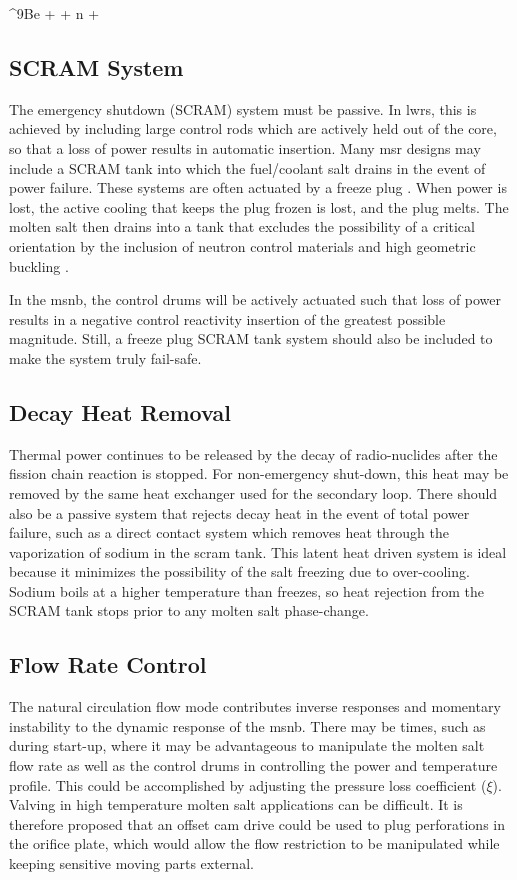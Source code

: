 \begin{reaction}\label{rxn:Be-n}
    ^{9}Be + \alpha {} + n + \gamma
\end{reaction}

\subsection{SCRAM System}
The emergency shutdown (\ie SCRAM) system must be passive. In \acsp{lwr}, this is achieved by including large control rods which are actively held out of the core, so that a loss of power results in automatic insertion. Many \acs{msr} designs may include a SCRAM tank into which the fuel/coolant salt drains in the event of power failure. These systems are often actuated by a freeze plug \cite{FreezePlug}. When power is lost, the active cooling that keeps the plug frozen is lost, and the plug melts. The molten salt then drains into a tank that excludes the possibility of a critical orientation by the inclusion of neutron control materials \cite[Ch. 1]{Charit} and high geometric buckling \cite[Ch. 6]{Lamarsh}.

In the \acs{msnb}, the control drums will be actively actuated such that loss of power results in a negative control reactivity insertion of the greatest possible magnitude. Still, a freeze plug SCRAM tank system should also be included to make the system truly fail-safe.

\subsection{Decay Heat Removal}
Thermal power continues to be released by the decay of radio-nuclides after the fission chain reaction is stopped. For non-emergency shut-down, this heat may be removed by the same heat exchanger used for the secondary loop. There should also be a passive system that rejects decay heat in the event of total power failure, such as a direct contact system which removes heat through the vaporization of sodium \cite{DecayHeat} in the scram tank. This latent heat driven system is ideal because it minimizes the possibility of the salt freezing due to over-cooling. Sodium boils at a higher temperature than \flinak freezes, so heat rejection from the SCRAM tank stops prior to any molten salt phase-change.

\subsection{Flow Rate Control}
The natural circulation flow mode contributes inverse responses and momentary instability to the dynamic response of the \acs{msnb}. There may be times, such as during start-up, where it may be advantageous to manipulate the molten salt flow rate as well as the control drums in controlling the power and temperature profile. This could be accomplished by adjusting the pressure loss coefficient ($\xi$). Valving in high temperature molten salt applications can be difficult. It is therefore proposed that an offset cam drive could be used to plug perforations in the orifice plate, which would allow the flow restriction to be manipulated while keeping sensitive moving parts external.

